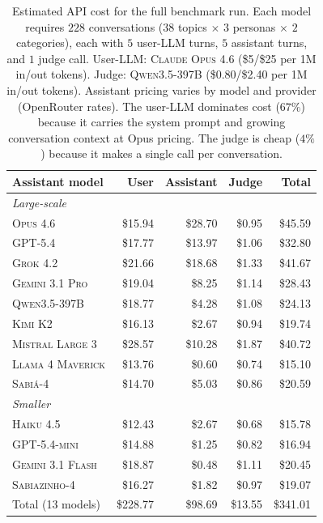 \documentclass[11pt,a4paper]{article}
\begin{document}
\begin{table}[!htbp]
\centering \small
\begin{tabular}{l|rrr|r}
\toprule
Assistant model & User & Assistant & Judge & Total \\
\midrule
\multicolumn{5}{l}{\textit{Large-scale}} \\
\textsc{Opus 4.6}          & \$15.94 & \$28.70 & \$0.95 & \$45.59 \\
\textsc{GPT-5.4}           & \$17.77 & \$13.97 & \$1.06 & \$32.80 \\
\textsc{Grok 4.2}          & \$21.66 & \$18.68 & \$1.33 & \$41.67 \\
\textsc{Gemini 3.1 Pro}    & \$19.04 &  \$8.25 & \$1.14 & \$28.43 \\
\textsc{Qwen3.5-397B}      & \$18.77 &  \$4.28 & \$1.08 & \$24.13 \\
\textsc{Kimi K2}           & \$16.13 &  \$2.67 & \$0.94 & \$19.74 \\
\textsc{Mistral Large 3}   & \$28.57 & \$10.28 & \$1.87 & \$40.72 \\
\textsc{Llama 4 Maverick}  & \$13.76 &  \$0.60 & \$0.74 & \$15.10 \\
\textsc{Sabi\'a-4}         & \$14.70 &  \$5.03 & \$0.86 & \$20.59 \\
\midrule
\multicolumn{5}{l}{\textit{Smaller}} \\
\textsc{Haiku 4.5}         & \$12.43 &  \$2.67 & \$0.68 & \$15.78 \\
\textsc{GPT-5.4-mini}      & \$14.88 &  \$1.25 & \$0.82 & \$16.94 \\
\textsc{Gemini 3.1 Flash}  & \$18.87 &  \$0.48 & \$1.11 & \$20.45 \\
\textsc{Sabiazinho-4}      & \$16.27 &  \$1.82 & \$0.97 & \$19.07 \\
\midrule
Total (13 models) & \$228.77 & \$98.69 & \$13.55 & \$341.01 \\
\bottomrule
\end{tabular}
\caption{Estimated API cost for the full benchmark run. Each model requires $228$ conversations ($38$ topics $\times$ $3$ personas $\times$ $2$ categories), each with $5$ user-LLM turns, $5$ assistant turns, and $1$ judge call. User-LLM: \textsc{Claude Opus 4.6} (\$5/\$25 per 1M in/out tokens). Judge: \textsc{Qwen3.5-397B} (\$0.80/\$2.40 per 1M in/out tokens). Assistant pricing varies by model and provider (OpenRouter rates). The user-LLM dominates cost ($67\%$) because it carries the system prompt and growing conversation context at Opus pricing. The judge is cheap ($4\%$) because it makes a single call per conversation.}
\label{tab:cost}
\end{table}
\end{document}
